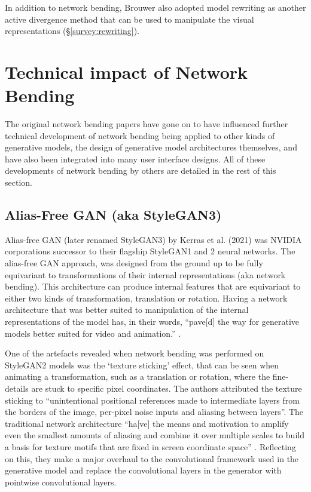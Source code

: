 In addition to network bending, Brouwer also adopted model rewriting \citep{bau2020rewriting} as another active divergence method that can be used to manipulate the visual representations (\S \ref{survey:rewriting}).

\section{Technical impact of Network Bending}

The original network bending papers \citep{broad2022network,broad2022network} have gone on to have influenced further technical development of network bending being applied to other kinds of generative models, the design of generative model architectures themselves, and have also been integrated into many user interface designs. All of these developments of network bending by others are detailed in the rest of this section.

 \subsection{Alias-Free GAN (aka StyleGAN3)}

 Alias-free GAN (later renamed StyleGAN3) by Kerras et al. (2021) was NVIDIA corporations successor to their flagship StyleGAN1 and 2 neural networks. 
 The alias-free GAN approach, was designed from the ground up to be fully equivariant to transformations of their internal representations (aka network bending). 
 This architecture can produce internal features that are equivariant to either two kinds of transformation, translation or rotation. 
 Having a network architecture that was better suited to manipulation of the internal representations of the model has, in their words, “pave[d] the way for generative models better suited for video and animation.” \citep{karras2021alias}.

 One of the artefacts revealed when network bending was performed on StyleGAN2 models was the ‘texture sticking’ effect, that can be seen when animating a transformation, such as a translation or rotation, where the fine-details are stuck to specific pixel coordinates. 
 The authors attributed the texture sticking to “unintentional positional references made to intermediate layers from the borders of the image, per-pixel noise inputs and aliasing between layers”. 
 The traditional network architecture “ha[ve] the means and motivation to amplify even the smallest amounts of aliasing and combine it over multiple scales to build a basis for texture motifs that are fixed in screen coordinate space” \citep{karras2021alias}.
 Reflecting on this, they make a major overhaul to the convolutional framework used in the generative model and replace the convolutional layers in the generator with pointwise convolutional layers.

